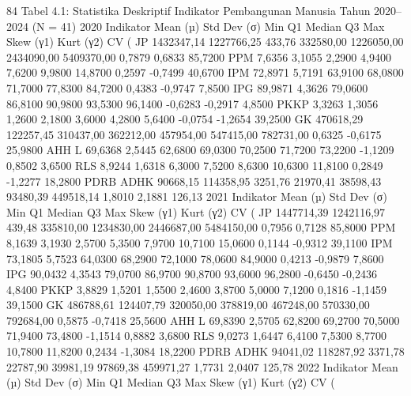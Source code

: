 84
Tabel 4.1: Statistika Deskriptif Indikator Pembangunan Manusia Tahun 2020–2024 (N =
41)
2020
Indikator Mean (µ) Std Dev (σ) Min Q1 Median Q3 Max Skew (γ1) Kurt (γ2) CV (%
JP 1432347,14 1227766,25 433,76 332580,00 1226050,00 2434090,00 5409370,00 0,7879 0,6833 85,7200 PPM 7,6356 3,1055 2,2900 4,9400 7,6200 9,9800 14,8700 0,2597 -0,7499 40,6700
IPM 72,8971 5,7191 63,9100 68,0800 71,7000 77,8300 84,7200 0,4383 -0,9747 7,8500
IPG 89,9871 4,3626 79,0600 86,8100 90,9800 93,5300 96,1400 -0,6283 -0,2917 4,8500 PKKP 3,3263 1,3056 1,2600 2,1800 3,6000 4,2800 5,6400 -0,0754 -1,2654 39,2500 GK 470618,29 122257,45 310437,00 362212,00 457954,00 547415,00 782731,00 0,6325 -0,6175 25,9800 AHH L 69,6368 2,5445 62,6800 69,0300 70,2500 71,7200 73,2200 -1,1209 0,8502 3,6500 RLS 8,9244 1,6318 6,3000 7,5200 8,6300 10,6300 11,8100 0,2849 -1,2277 18,2800 PDRB ADHK 90668,15 114358,95 3251,76 21970,41 38598,43 93480,39 449518,14 1,8010 2,1881 126,13
2021
Indikator Mean (µ) Std Dev (σ) Min Q1 Median Q3 Max Skew (γ1) Kurt (γ2) CV (%
JP 1447714,39 1242116,97 439,48 335810,00 1234830,00 2446687,00 5484150,00 0,7956 0,7128 85,8000 PPM 8,1639 3,1930 2,5700 5,3500 7,9700 10,7100 15,0600 0,1144 -0,9312 39,1100
IPM 73,1805 5,7523 64,0300 68,2900 72,1000 78,0600 84,9000 0,4213 -0,9879 7,8600
IPG 90,0432 4,3543 79,0700 86,9700 90,8700 93,6000 96,2800 -0,6450 -0,2436 4,8400 PKKP 3,8829 1,5201 1,5500 2,4600 3,8700 5,0000 7,1200 0,1816 -1,1459 39,1500 GK 486788,61 124407,79 320050,00 378819,00 467248,00 570330,00 792684,00 0,5875 -0,7418 25,5600 AHH L 69,8390 2,5705 62,8200 69,2700 70,5000 71,9400 73,4800 -1,1514 0,8882 3,6800 RLS 9,0273 1,6447 6,4100 7,5300 8,7700 10,7800 11,8200 0,2434 -1,3084 18,2200 PDRB ADHK 94041,02 118287,92 3371,78 22787,90 39981,19 97869,38 459971,27 1,7731 2,0407 125,78
2022
Indikator Mean (µ) Std Dev (σ) Min Q1 Median Q3 Max Skew (γ1) Kurt (γ2) CV (%

